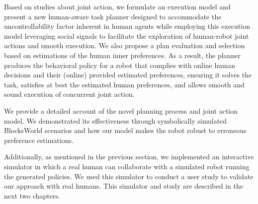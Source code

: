 Based on studies about joint action, we formulate an execution model and present a new human-aware task planner designed to accommodate the uncontrollability factor inherent in human agents while employing this execution model leveraging social signals to facilitate the exploration of human-robot joint actions and smooth execution. 
We also propose a plan evaluation and selection based on estimations of the human inner preferences.
As a result, the planner produces the behavioral policy for a robot that complies with online human decisions and their (online) provided estimated preferences, 
ensuring it solves the task, satisfies at best the estimated human preferences, and allows smooth and sound execution of concurrent joint action.

We provide a detailed account of the novel planning process and joint action model. We demonstrated its effectiveness through symbolically simulated BlocksWorld scenarios and how our model makes the robot robust to erroneous preference estimations.

Additionally, as mentioned in the previous section, we implemented an interactive simulator in which a real human can collaborate with a simulated robot running the generated policies. We used this simulator to conduct a user study to validate our approach with real humans. This simulator and study are described in the next two chapters.  
